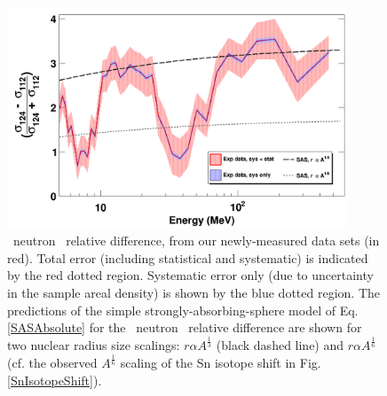 \begin{figure}[tb]
    \centering
    \includegraphics[width=0.9\textwidth]{figures/relativeDiff_Sn124Sn112.png}
    \caption[\snTwelveFour\ neutron \tot\ relative difference]
    {
        \snTwelveFour\ neutron \tot\ relative difference, from our newly-measured
        data sets (in red). Total error (including statistical and systematic)
        is indicated by the red dotted region. Systematic error only (due to
        uncertainty in the sample areal density) is shown by the blue dotted region.   
        The predictions of the simple strongly-absorbing-sphere model of
        Eq. \ref{SASAbsolute} for the \snTwelveFour\ neutron \tot\ relative
        difference are shown for two nuclear radius size scalings: $r \alpha A^{\frac{1}{3}}$
        (black dashed line) and $r \alpha A^{\frac{1}{6}}$
        (cf. the observed $A^{\frac{1}{6}}$ scaling of the Sn isotope shift in Fig.
        \ref{SnIsotopeShift}).
    }
    \label{IsotopicDifferenceSn}
\end{figure}

\afterpage{\clearpage}
